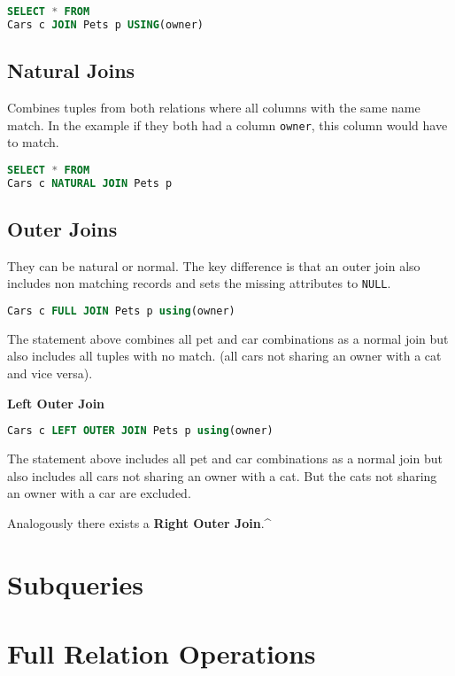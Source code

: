 \documentclass{sciposter}
\newcommand{\TODO}[1]{\todo[inline]{\Large TODO:  #1}}
\renewcommand{\t}[1]{\texttt{#1}}
\begin{document}
\begin{multicols}{3}
\begin{lstlisting}[language=SQL]
SELECT * FROM 
Cars c JOIN Pets p USING(owner)
\end{lstlisting}

\subsection*{Natural Joins}
Combines tuples from both relations where all columns with the same name match. In the example if they both had a column \t{owner}, this column would have to match.
\begin{lstlisting}[language=SQL]
SELECT * FROM 
Cars c NATURAL JOIN Pets p
\end{lstlisting}


\subsection*{Outer Joins}

They can be natural or normal. The key difference is that an outer join also includes non matching records and sets the missing attributes to \t{NULL}.
\begin{lstlisting}[language=SQL]
Cars c FULL JOIN Pets p using(owner)
\end{lstlisting}
The statement above combines all pet and car combinations as a normal join but also includes all tuples with no match. (all cars not sharing an owner with a cat and vice versa).

\textbf{Left Outer Join}
\begin{lstlisting}[language=SQL]
Cars c LEFT OUTER JOIN Pets p using(owner)
\end{lstlisting}
The statement above includes all pet and car combinations as a normal join but also includes all cars not sharing an owner with a cat. But the cats not sharing an owner with a car are excluded.

Analogously there exists a \textbf{Right Outer Join}.^

\section*{Subqueries}

\section*{Full Relation Operations}

\TODO{...}



\end{multicols}
\end{document}
